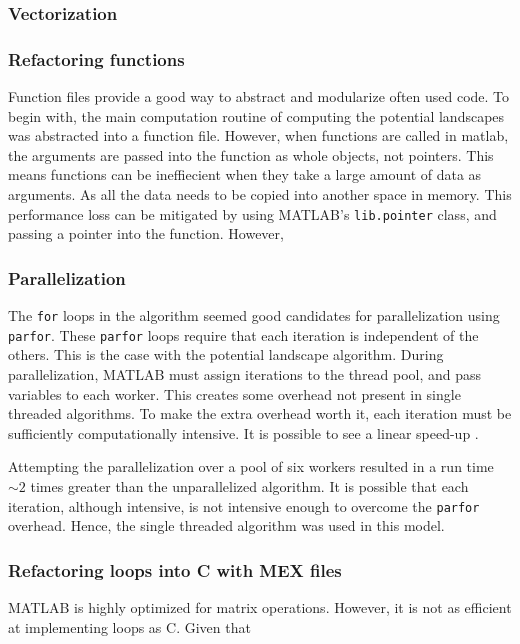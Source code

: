 \documentclass[]{article}
\begin{document}
\subsubsection{Vectorization}

\subsubsection{Refactoring functions}
Function files provide a good way to abstract and modularize often used code. To begin with, the main computation routine of computing the potential landscapes was abstracted into a function file. However, when functions are called in matlab, the arguments are passed into the function as whole objects, not pointers. This means functions can be ineffiecient when they take a large amount of data as arguments. As all the data needs to be copied into another space in memory. This performance loss can be mitigated by using MATLAB's \texttt{lib.pointer} class, and passing a pointer into the function. However, 

\subsubsection{Parallelization}
The \texttt{for} loops in the algorithm seemed good candidates for parallelization using \texttt{parfor}. These \texttt{parfor} loops require that each iteration is independent of the others. This is the case with the potential landscape algorithm. During parallelization, MATLAB must assign iterations to the thread pool, and pass variables to each worker. This creates some overhead not present in single threaded algorithms. To make the extra overhead worth it, each iteration must be sufficiently computationally intensive. It is possible to see a linear speed-up \cite{}.

Attempting the parallelization over a pool of six workers resulted in a run time $\sim2$ times greater than the unparallelized algorithm. It is possible that each iteration, although intensive, is not intensive enough to overcome the \texttt{parfor} overhead. Hence, the single threaded algorithm was used in this model. 

\subsubsection{Refactoring loops into C with MEX files}
MATLAB is highly optimized for matrix operations. However, it is not as efficient at implementing loops as C. Given that
\end{document}
